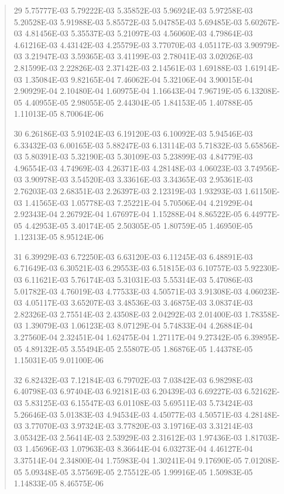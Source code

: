 \documentclass[letterpaper,10pt,english]{sphinxmanual}
\begin{document}
\begin{quote}
\begin{DUlineblock}{0em}
\item[] 29   5.75777E-03  5.79222E-03  5.35852E-03  5.96924E-03  5.97258E-03  5.20528E-03  5.91988E-03  5.85572E-03  5.04785E-03  5.69485E-03  5.60267E-03  4.81456E-03  5.35537E-03  5.21097E-03  4.56060E-03  4.79864E-03  4.61216E-03  4.43142E-03  4.25579E-03  3.77070E-03  4.05117E-03  3.90979E-03  3.21947E-03  3.59365E-03  3.41199E-03  2.78041E-03  3.02026E-03  2.81599E-03  2.22826E-03  2.37142E-03  2.14561E-03  1.69188E-03  1.61914E-03  1.35084E-03  9.82165E-04  7.46062E-04  5.32106E-04  3.90015E-04  2.90929E-04  2.10480E-04  1.60975E-04  1.16643E-04  7.96719E-05  6.13208E-05  4.40955E-05  2.98055E-05  2.44304E-05  1.84153E-05  1.40788E-05  1.11013E-05  8.70064E-06
\item[] 30   6.26186E-03  5.91024E-03  6.19120E-03  6.10092E-03  5.94546E-03  6.33432E-03  6.00165E-03  5.88247E-03  6.13114E-03  5.71832E-03  5.65856E-03  5.80391E-03  5.32190E-03  5.30109E-03  5.23899E-03  4.84779E-03  4.96554E-03  4.74969E-03  4.26371E-03  4.28148E-03  4.06023E-03  3.74956E-03  3.90978E-03  3.54520E-03  3.33616E-03  3.34365E-03  2.95361E-03  2.76203E-03  2.68351E-03  2.26397E-03  2.12319E-03  1.93293E-03  1.61150E-03  1.41565E-03  1.05778E-03  7.25221E-04  5.70506E-04  4.21929E-04  2.92343E-04  2.26792E-04  1.67697E-04  1.15288E-04  8.86522E-05  6.44977E-05  4.42953E-05  3.40174E-05  2.50305E-05  1.80759E-05  1.46950E-05  1.12313E-05  8.95124E-06
\item[] 31   6.39929E-03  6.72250E-03  6.63120E-03  6.11245E-03  6.48891E-03  6.71649E-03  6.30521E-03  6.29553E-03  6.51815E-03  6.10757E-03  5.92230E-03  6.11621E-03  5.76174E-03  5.31031E-03  5.55314E-03  5.47086E-03  5.01782E-03  4.76019E-03  4.77533E-03  4.50571E-03  3.91308E-03  4.06023E-03  4.05117E-03  3.65207E-03  3.48536E-03  3.46875E-03  3.08374E-03  2.82326E-03  2.75514E-03  2.43508E-03  2.04292E-03  2.01400E-03  1.78358E-03  1.39079E-03  1.06123E-03  8.07129E-04  5.74833E-04  4.26884E-04  3.27560E-04  2.32451E-04  1.62475E-04  1.27117E-04  9.27342E-05  6.39895E-05  4.89132E-05  3.55494E-05  2.55807E-05  1.86876E-05  1.44378E-05  1.15031E-05  9.01100E-06
\item[] 32   6.82432E-03  7.12184E-03  6.79702E-03  7.03842E-03  6.98298E-03  6.40798E-03  6.97404E-03  6.92181E-03  6.20439E-03  6.69227E-03  6.52162E-03  5.83125E-03  6.15547E-03  6.01108E-03  5.69511E-03  5.73424E-03  5.26646E-03  5.01383E-03  4.94534E-03  4.45077E-03  4.50571E-03  4.28148E-03  3.77070E-03  3.97324E-03  3.77820E-03  3.19716E-03  3.31214E-03  3.05342E-03  2.56414E-03  2.53929E-03  2.31612E-03  1.97436E-03  1.81703E-03  1.45696E-03  1.07963E-03  8.36644E-04  6.03273E-04  4.46127E-04  3.37514E-04  2.34800E-04  1.75983E-04  1.30241E-04  9.17690E-05  7.01208E-05  5.09348E-05  3.57569E-05  2.75512E-05  1.99916E-05  1.50983E-05  1.14833E-05  8.46575E-06

\end{DUlineblock}
\end{quote}
\end{document}
